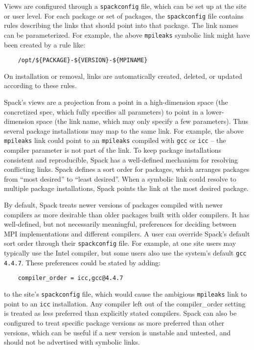 Views are configured through a {\tt spackconfig} file, which can be set up at the site or user level.
For each package or set of packages, the {\tt spackconfig} file contains rules
describing the links that should point into that package.
The link names can be parameterized.
For example, the above {\tt mpileaks} symbolic link might have been created by a rule like:
%
\begin{verbatim}
    /opt/${PACKAGE}-${VERSION}-${MPINAME}
\end{verbatim}
%
On installation or removal,
links are automatically created, deleted, or updated according to these rules.  

Spack's views are a projection from a point in a high-dimension space
(the concretized spec, which fully specifies all parameters) to point in a lower-dimension space
(the link name, which may only specify a few parameters).
Thus several package installations may map to the same link.
For example, the above {\tt mpileaks} link could point to an {\tt mpileaks} compiled with
{\tt gcc} or {\tt icc} -- the compiler parameter is not part of the link.
To keep  package installations  consistent and reproducible,
Spack has a well-defined mechanism for resolving conflicting links.
Spack defines a sort order for packages, which arranges packages from ``most desired'' to ``least desired''.
When a symbolic link could resolve to multiple package installations,
Spack points the link at the most desired package.  

By default, Spack treats newer versions of packages compiled with newer compilers
as more desirable than older packages built with older compilers.
It has well-defined, but not necessarily meaningful,
preferences for deciding between MPI implementations and different compilers.
A user can override Spack's default sort order through their {\tt spackconfig} file.
For example, at one site users may typically use the Intel compiler,
but some users also use the system's default {\tt gcc 4.4.7}.
These preferences could be stated by adding:
%
\begin{verbatim}
    compiler_order = icc,gcc@4.4.7
\end{verbatim}
%
to the site's {\tt spackconfig} file, which would cause the ambigious {\tt mpileaks} link to point to an {\tt icc} installation.
Any compiler left out of the compiler\_order setting is treated as less preferred than explicitly stated compilers.
Spack can also be configured to treat specific package versions as more preferred than other versions,
which can be useful if a new version is unstable and untested, and should not be advertised with symbolic links.  


